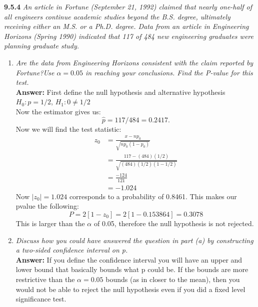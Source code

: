 \documentclass[11pt]{article}
\begin{document}
\noindent \textbf{9.5.4} \emph{An article in Fortune (September 21, 1992) claimed that nearly one-half of all engineers continue academic studies beyond the B.S. degree, ultimately receiving either an M.S. or a Ph.D. degree. Data from an article in Engineering Horizons (Spring 1990) indicated that 117 of 484 new engineering graduates were planning graduate study.}
\begin{enumerate}
\item \emph{Are the data from Engineering Horizons consistent with the claim reported by Fortune?Use $\alpha=0.05$ in reaching your conclusions. Find the P-value for this test.}
\\\textbf{Answer:} First define the null hypothesis and alternative hypothesis\\
$H_0: p = 1/2$, $H_1: 0 \neq 1/2$\\
Now the estimator gives us:
\begin{equation}
\hat{p} = 117/484 = 0.2417. 
\end{equation}
Now we will find the test statistic:
\begin{equation}
\begin{split}
z_0 &= \frac{x - np_0}{\sqrt{np_0(1-p_0)}}\\
&= \frac{117 - (484)(1/2)}{\sqrt{(484)(1/2)(1-1/2)}} \\
&= \frac{-124}{121}\\
&= -1.024
\end{split}
\end{equation}
Now $|z_0| = 1.024$ corresponds to a probability of 0.8461. This makes our pvalue the following:
\begin{equation}
P = 2[1-z_0] = 2[1-0.153864] = 0.3078
\end{equation}
This is larger than the $\alpha$ of 0.05, therefore the null hypothesis is not rejected. 

\item \emph{Discuss how you could have answered the question in part (a) by constructing a two-sided confidence interval on p.}
\\\textbf{Answer:} If you define the confidence interval you will have an upper and lower bound that basically bounds what p could be. If the bounds are more restrictive than the $\alpha = 0.05$ bounds (as in closer to the mean), then you would not be able to reject the null hypothesis even if you did a fixed level significance test.
\end{enumerate}
\end{document}

